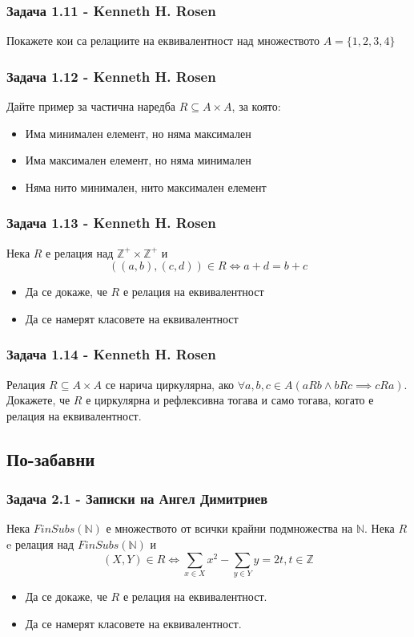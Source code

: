 \documentclass[12pt]{article}
\begin{document}
\subsubsection*{Задача 1.11 - Kenneth H. Rosen}
Покажете кои са релациите на еквивалентност над множеството $A = \{ 1, 2, 3, 4 \}$

\subsubsection*{Задача 1.12 - Kenneth H. Rosen}
Дайте пример за частична наредба $R \subseteq A \times A$, за която:
\begin{itemize}
    \item Има минимален елемент, но няма максимален
    \item Има максимален елемент, но няма минимален
    \item Няма нито минимален, нито максимален елемент
\end{itemize}

\subsubsection*{Задача 1.13 - Kenneth H. Rosen}
Нека $R$ е релация над $\mathbb{Z}^+ \times \mathbb{Z}^+$ и 
\begin{equation*}
    ((a, b), (c, d)) \in R \iff a + d = b + c
\end{equation*}
\begin{itemize}
    \item Да се докаже, че $R$ е релация на еквивалентност
    \item Да се намерят класовете на еквивалентност
\end{itemize} 

\subsubsection*{Задача 1.14 - Kenneth H. Rosen}
Релация $R \subseteq A \times A$ се нарича циркулярна, ако $\forall a, b, c \in A(aRb \land bRc \implies cRa)$. 
Докажете, че $R$ е циркулярна и рефлексивна тогава и само тогава, когато е релация на еквивалентност.

\subsection*{По-забавни}
\subsubsection*{Задача 2.1 - Записки на Ангел Димитриев}
Нека $FinSubs(\mathbb{N})$ е множеството от всички крайни подмножества на $\mathbb{N}$. Нека $R$ e релация над $FinSubs(\mathbb{N})$ и  
\begin{equation*}
    (X, Y) \in R \iff \displaystyle\sum_{x \in X} x^2 - \displaystyle\sum_{y \in Y} y = 2t, t \in \mathbb{Z} 
\end{equation*}
\begin{itemize}
    \item Да се докаже, че $R$ е релация на еквивалентност.
    \item Да се намерят класовете на еквивалентност.
\end{itemize}
\end{document}
